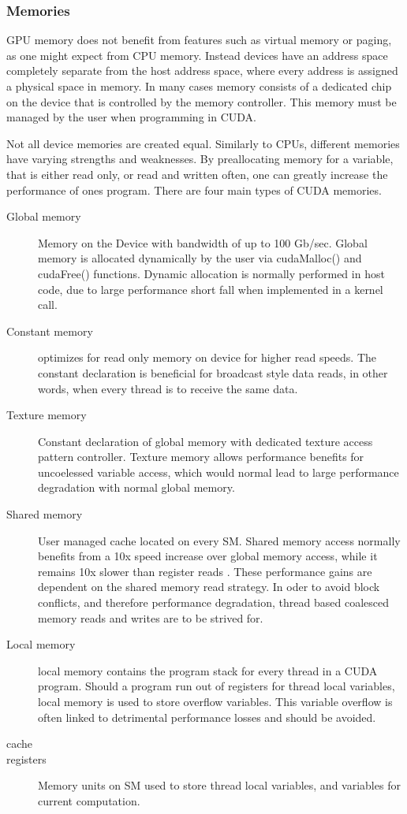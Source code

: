 \subsubsection{Memories}\label{sssec:memories}
GPU memory does not benefit from features such as virtual
memory or paging, as one might expect from CPU memory. Instead devices have an
address space completely separate from the host address space, where every address is assigned a physical space in memory.
In many cases memory consists of a dedicated chip on the device that is controlled
by the memory controller.  This memory must be managed by the user when programming in CUDA.
\par
Not all device memories are created equal.  Similarly to \Glspl{CPU},
different memories have varying strengths and weaknesses.  By preallocating memory for a variable,
that is either read only, or read and written often, one can greatly increase the
performance of ones program\cite{Wilt}.   %
There are four main types of CUDA memories.
\begin{description}
  \item [Global memory] Memory on the Device with bandwidth of up to 100 Gb/sec.
  Global memory is allocated dynamically by the user via cudaMalloc() and cudaFree() functions.
  Dynamic allocation is normally performed in host code, due to large performance short fall
  when implemented in a kernel call.
  \item [Constant memory] optimizes for read only memory on device for higher
  read speeds.  The constant declaration is beneficial for broadcast style data
  reads, in other words, when every thread is to receive the same data.
  \item [Texture memory] Constant declaration of global memory with dedicated
   texture access pattern controller.  Texture memory allows performance benefits
   for uncoelessed variable access, which would normal lead to large performance
   degradation with normal global memory.
  \item [Shared memory] User managed cache located on every \Gls{SM}.  Shared memory access
  normally benefits from a 10x speed increase over global memory access, while it remains
  10x slower than register reads \cite{Wilt}.  These performance gains are dependent
  on the shared memory read strategy.  In oder to avoid block conflicts, and therefore
  performance degradation, thread based coalesced memory reads and writes are to
  be strived for.
  \item [Local memory] local memory contains the program stack for every thread
  in a CUDA program. Should a program run out of registers for thread local variables,
  local memory is  used to store overflow variables. This variable overflow is often
  linked to detrimental performance losses and should be avoided.\cite{Wilt}
  \item [cache]
  \item [registers] Memory units on \Gls{SM} used to store thread local variables,
                    and variables for current computation.
\end{description}

